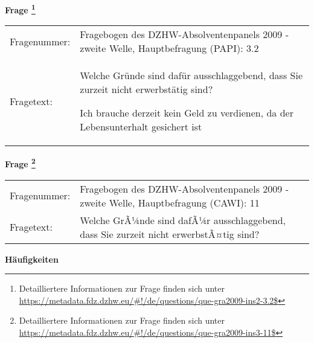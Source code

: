 				\vspace*{0.5cm}
                \noindent\textbf{Frage
	                \footnote{Detailliertere Informationen zur Frage finden sich unter
		              \url{https://metadata.fdz.dzhw.eu/\#!/de/questions/que-gra2009-ins2-3.2$}}}\\
				\begin{tabularx}{\hsize}{@{}lX}
					Fragenummer: &
					  Fragebogen des DZHW-Absolventenpanels 2009 - zweite Welle, Hauptbefragung (PAPI):
					  3.2
 \\
					Fragetext: & Welche Gründe sind dafür ausschlaggebend, dass Sie zurzeit nicht erwerbstätig sind?\par  Ich brauche derzeit kein Geld zu verdienen, da der Lebensunterhalt gesichert ist \\
				\end{tabularx}
				\vspace*{0.5cm}
                \noindent\textbf{Frage
	                \footnote{Detailliertere Informationen zur Frage finden sich unter
		              \url{https://metadata.fdz.dzhw.eu/\#!/de/questions/que-gra2009-ins3-11$}}}\\
				\begin{tabularx}{\hsize}{@{}lX}
					Fragenummer: &
					  Fragebogen des DZHW-Absolventenpanels 2009 - zweite Welle, Hauptbefragung (CAWI):
					  11
 \\
					Fragetext: & Welche GrÃ¼nde sind dafÃ¼r ausschlaggebend, dass Sie zurzeit nicht erwerbstÃ¤tig sind? \\
				\end{tabularx}





        		\vspace*{0.5cm}
                \noindent\textbf{Häufigkeiten}

